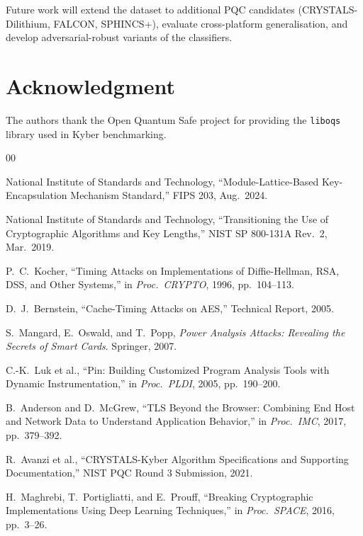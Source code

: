 \documentclass[conference]{IEEEtran}
\begin{document}
Future work will extend the dataset to additional PQC candidates
(CRYSTALS-Dilithium, FALCON, SPHINCS+), evaluate cross-platform
generalisation, and develop adversarial-robust variants of the
classifiers.

\section*{Acknowledgment}

The authors thank the Open Quantum Safe project \cite{liboqs} for
providing the \texttt{liboqs} library used in Kyber benchmarking.

\begin{thebibliography}{00}

National Institute of Standards and Technology,
``Module-Lattice-Based Key-Encapsulation Mechanism Standard,''
FIPS 203, Aug.\ 2024.

National Institute of Standards and Technology,
``Transitioning the Use of Cryptographic Algorithms and Key Lengths,''
NIST SP 800-131A Rev.\ 2, Mar.\ 2019.

P.\ C.\ Kocher,
``Timing Attacks on Implementations of Diffie-Hellman, RSA, DSS, and
Other Systems,''
in \textit{Proc.\ CRYPTO}, 1996, pp.\ 104--113.

D.\ J.\ Bernstein,
``Cache-Timing Attacks on AES,''
Technical Report, 2005.

S.\ Mangard, E.\ Oswald, and T.\ Popp,
\textit{Power Analysis Attacks: Revealing the Secrets of Smart Cards}.
Springer, 2007.

C.-K.\ Luk et al.,
``Pin: Building Customized Program Analysis Tools with Dynamic
Instrumentation,''
in \textit{Proc.\ PLDI}, 2005, pp.\ 190--200.

B.\ Anderson and D.\ McGrew,
``TLS Beyond the Browser: Combining End Host and Network Data to
Understand Application Behavior,''
in \textit{Proc.\ IMC}, 2017, pp.\ 379--392.

R.\ Avanzi et al.,
``CRYSTALS-Kyber Algorithm Specifications and Supporting Documentation,''
NIST PQC Round 3 Submission, 2021.

H.\ Maghrebi, T.\ Portigliatti, and E.\ Prouff,
``Breaking Cryptographic Implementations Using Deep Learning Techniques,''
in \textit{Proc.\ SPACE}, 2016, pp.\ 3--26.


\end{thebibliography}
\end{document}
